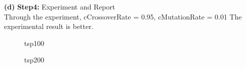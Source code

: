 \documentclass[11pt]{article}
\renewcommand\part[1]{\vspace{.10in}\textbf{(#1)}}
\newcommand\four{\vspace{.10in}\textbf{Step4: }}
\begin{document}
\part{d} \four Experiment and Report\\
Through the experiment, cCrossoverRate = 0.95, cMutationRate = 0.01 The experimental result is better.\\
\begin{figure}[H]
    \centering
    \caption{tsp100}
\end{figure}

\begin{figure}[H]
    \centering
    \caption{tsp200}
\end{figure}
\end{document}
